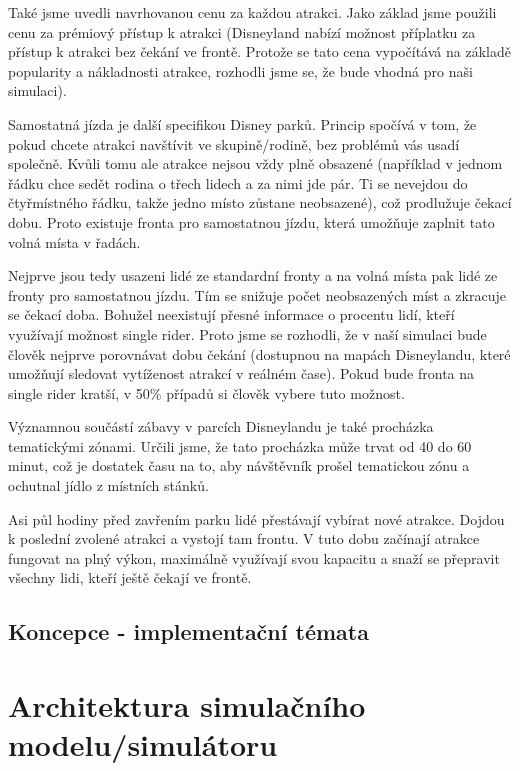 \documentclass[a4paper,12pt]{article}
\begin{document}
Také jsme uvedli navrhovanou cenu za každou atrakci. Jako základ jsme použili cenu za prémiový přístup k atrakci (Disneyland nabízí možnost příplatku za přístup k atrakci bez čekání ve frontě. Protože se tato cena vypočítává na základě popularity a nákladnosti atrakce, rozhodli jsme se, že bude vhodná pro naši simulaci).

Samostatná jízda je další specifikou Disney parků. Princip spočívá v tom, že pokud chcete atrakci navštívit ve skupině/rodině, bez problémů vás usadí společně. Kvůli tomu ale atrakce nejsou vždy plně obsazené (například v jednom řádku chce sedět rodina o třech lidech a za nimi jde pár. Ti se nevejdou do čtyřmístného řádku, takže jedno místo zůstane neobsazené), což prodlužuje čekací dobu. Proto existuje fronta pro samostatnou jízdu, která umožňuje zaplnit tato volná místa v řadách.

Nejprve jsou tedy usazeni lidé ze standardní fronty a na volná místa pak lidé ze fronty pro samostatnou jízdu. Tím se snižuje počet neobsazených míst a zkracuje se čekací doba.
Bohužel neexistují přesné informace o procentu lidí, kteří využívají možnost single rider. Proto jsme se rozhodli, že v naší simulaci bude člověk nejprve porovnávat dobu čekání (dostupnou na mapách Disneylandu, které umožňují sledovat vytíženost atrakcí v reálném čase). Pokud bude fronta na single rider kratší, v 50\% případů si člověk vybere tuto možnost.


Významnou součástí zábavy v parcích Disneylandu je také procházka tematickými zónami. Určili jsme, že tato procházka může trvat od 40 do 60 minut, což je dostatek času na to, aby návštěvník prošel tematickou zónu a ochutnal jídlo z místních stánků.

Asi půl hodiny před zavřením parku lidé přestávají vybírat nové atrakce. Dojdou k poslední zvolené atrakci a vystojí tam frontu. V tuto dobu začínají atrakce fungovat na plný výkon, maximálně využívají svou kapacitu a snaží se přepravit všechny lidi, kteří ještě čekají ve frontě.



\subsection{Koncepce - implementační témata}

\section{Architektura simulačního modelu/simulátoru}
\end{document}
